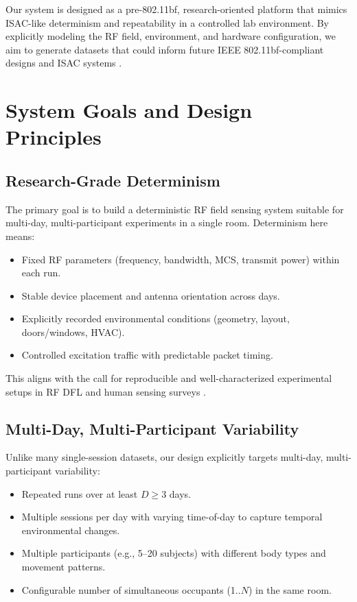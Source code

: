\documentclass[11pt,a4paper]{article}
\begin{document}
Our system is designed as a pre-802.11bf, research-oriented platform that mimics ISAC-like determinism and repeatability in a controlled lab environment. By explicitly modeling the RF field, environment, and hardware configuration, we aim to generate datasets that could inform future IEEE 802.11bf-compliant designs and ISAC systems \cite{wang2022isac,du2023bf}.

\section{System Goals and Design Principles}

\subsection{Research-Grade Determinism}

The primary goal is to build a deterministic RF field sensing system suitable for multi-day, multi-participant experiments in a single room. Determinism here means:

\begin{itemize}[leftmargin=*]
\item Fixed RF parameters (frequency, bandwidth, MCS, transmit power) within each run.
\item Stable device placement and antenna orientation across days.
\item Explicitly recorded environmental conditions (geometry, layout, doors/windows, HVAC).
\item Controlled excitation traffic with predictable packet timing.
\end{itemize}

This aligns with the call for reproducible and well-characterized experimental setups in RF DFL and human sensing surveys \cite{denis2019dfl,shahbazian2023human}.

\subsection{Multi-Day, Multi-Participant Variability}

Unlike many single-session datasets, our design explicitly targets multi-day, multi-participant variability:

\begin{itemize}[leftmargin=*]
\item Repeated runs over at least $D \geq 3$ days.
\item Multiple sessions per day with varying time-of-day to capture temporal environmental changes.
\item Multiple participants (e.g., 5--20 subjects) with different body types and movement patterns.
\item Configurable number of simultaneous occupants (1..$N$) in the same room.
\end{itemize}
\end{document}
